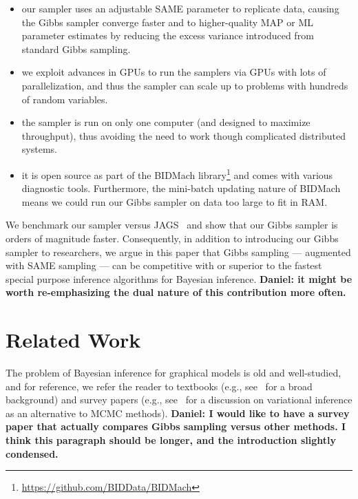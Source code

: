 \documentclass{article} %
\begin{document}
\begin{itemize}[noitemsep]
    \item our sampler uses an adjustable SAME parameter to replicate data, causing the Gibbs
    sampler converge faster and to higher-quality MAP or ML parameter estimates by reducing the
    excess variance introduced from standard Gibbs sampling.
    \item we exploit advances in GPUs to run the samplers via GPUs with lots of parallelization, and
    thus the sampler can scale up to problems with hundreds of random variables.
    \item the sampler is run on only one computer (and designed to maximize throughput), thus
    avoiding the need to work though complicated distributed systems.
    \item it is open source as part of the BIDMach
    library\footnote{\url{https://github.com/BIDData/BIDMach}} and comes with various diagnostic
    tools. Furthermore, the mini-batch updating nature of BIDMach means we could run our Gibbs
    sampler on data too large to fit in RAM.
\end{itemize}

We benchmark our sampler versus JAGS~\citep{JAGS2003} and show that our Gibbs sampler is orders of
magnitude faster. Consequently, in addition to introducing our Gibbs sampler to researchers, we
argue in this paper that Gibbs sampling --- augmented with SAME sampling --- can be competitive with
or superior to the fastest special purpose inference algorithms for Bayesian inference.
\textbf{Daniel: it might be worth re-emphasizing the dual nature of this contribution more often.}





\section{Related Work}\label{sec:related_work}

The problem of Bayesian inference for graphical models is old and well-studied, and for reference,
we refer the reader to textbooks (e.g., see~\citet{Koller2009} for a broad background) and survey
papers (e.g., see~\citet{Wainwright2008} for a discussion on variational inference as an alternative
to MCMC methods). \textbf{Daniel: I would like to have a survey paper that actually compares Gibbs
sampling versus other methods. I think this paragraph should be longer, and the introduction
slightly condensed.}
\end{document}

